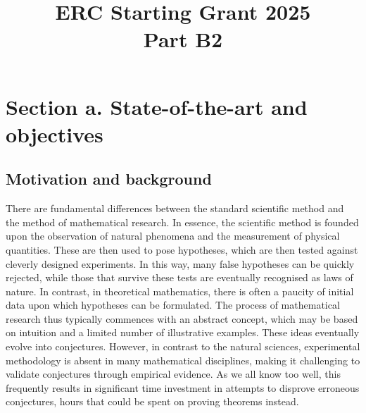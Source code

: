\documentclass[a4paper,12pt,english]{article}
\begin{document}
\title{ \textbf{\large {ERC Starting Grant 2025} \\ \large Part B2  }}

\author{%
}
\date{}

\maketitle
\thispagestyle{fancy}

\section*{Section a. State-of-the-art and objectives}

\subsection*{Motivation and background}

There are fundamental differences between the standard scientific method and the method of mathematical research.
In essence, the scientific method is founded upon the observation of natural phenomena and the measurement of physical quantities.
These are then used to pose hypotheses, which are then tested against cleverly designed experiments.
In this way, many false hypotheses can be quickly rejected,
while those that survive these tests are eventually recognised as laws of nature.
In contrast, in theoretical mathematics, there is often a paucity of initial data upon which hypotheses can be formulated.
The process of mathematical research thus typically commences with an abstract concept, which may be based on intuition and a limited number of illustrative examples. 
These ideas eventually evolve into conjectures.
However, in contrast to the natural sciences, experimental methodology is absent in many mathematical disciplines, making it challenging to validate conjectures through empirical evidence.
As we all know too well, this frequently results in significant time investment in attempts to disprove erroneous conjectures, hours that could be spent on proving theorems instead.
\end{document}
